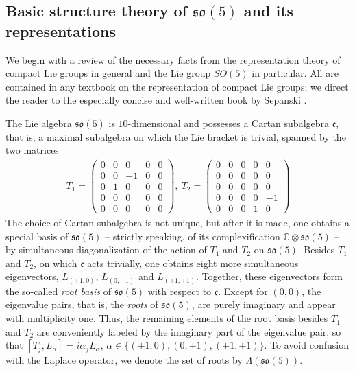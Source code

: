 \documentclass[11pt,reqno]{amsart}
\theoremstyle{remark}
\theoremstyle{definition}
\newcommand{\sov}{\mathfrak{so}(5)}
\begin{document}
\subsection{Basic structure theory of $\sov$ and its representations}

We begin with a review of the necessary facts from the representation theory of compact Lie groups in general and the Lie group $SO(5)$ in particular. All are contained in any textbook on the representation of compact Lie groups; we direct the reader to the especially concise and well-written book by Sepanski \cite{Sepanski2007}.

The Lie algebra $\sov$ is $10$-dimensional and possesses a Cartan subalgebra $\mathfrak c$, that is, a maximal subalgebra on which the Lie bracket is trivial, spanned by the two matrices
\begin{align*}
    T_1 = \begin{pmatrix}
        0 & 0 & 0 & 0 & 0 \\
        0 & 0 & -1 & 0 & 0 \\
        0 & 1 & 0 & 0 & 0 \\
        0 & 0 & 0 & 0 & 0 \\
        0 & 0 & 0 & 0 & 0 
    \end{pmatrix}, \ 
    T_2 = \begin{pmatrix}
        0 & 0 & 0 & 0 & 0 \\
        0 & 0 & 0 & 0 & 0 \\
        0 & 0 & 0 & 0 & 0 \\
        0 & 0 & 0 & 0 & -1 \\
        0 & 0 & 0 & 1 & 0 
    \end{pmatrix}
\end{align*}
The choice of Cartan subalgebra is not unique, but after it is made, one obtains a special basis of $\sov$ -- strictly speaking, of its complexification $\mathbb C \otimes \sov$ -- by simultaneous diagonalization of the action of $T_1$ and $T_2$ on $\sov$. Besides $T_1$ and $T_2$, on which $\mathfrak c$ acts trivially, one obtains eight more simultaneous eigenvectors, $L_{(\pm 1,0)}$, $L_{(0,\pm 1)}$ and $L_{(\pm 1,\pm 1)}$. Together, these eigenvectors form the so-called \emph{root basis} of $\sov$ with respect to $\mathfrak c$. Except for $(0,0)$, the eigenvalue pairs, that is, the \emph{roots} of $\sov$, are purely imaginary and appear with multiplicity one. Thus, the remaining elements of the root basis besides $T_1$ and $T_2$ are conveniently labeled by the imaginary part of the eigenvalue pair, so that $[T_j,L_\alpha] = i \alpha_j L_\alpha$, $\alpha \in \{(\pm 1,0),(0,\pm 1),(\pm 1,\pm 1)\}$. To avoid confusion with the Laplace operator, we denote the set of roots by $\Lambda(\sov)$.
\end{document}
